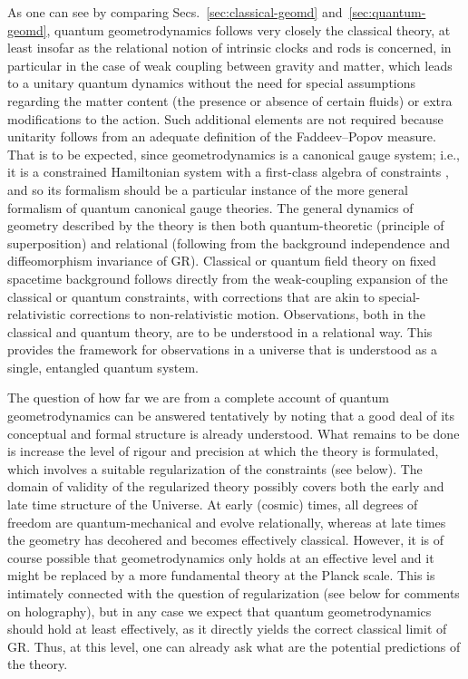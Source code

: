 \documentclass[12pt]{iopart}
\begin{document}
As one can see by comparing Secs.~\ref{sec:classical-geomd} and~\ref{sec:quantum-geomd}, quantum geometrodynamics follows very closely the classical theory, at least insofar as the relational notion of intrinsic clocks and rods is concerned, in particular in the case of weak coupling between gravity and matter, which leads to a unitary quantum dynamics without the need for special assumptions regarding the matter content (the presence or absence of certain fluids) or extra modifications to the action. Such additional elements are not required because unitarity follows from an adequate definition of the Faddeev--Popov measure. That is to be expected, since geometrodynamics is a canonical gauge system; i.e., it is a constrained Hamiltonian system with a first-class algebra of constraints \citep{HT:book}, and so its formalism should be a particular instance of the more general formalism of quantum canonical gauge theories. The general dynamics of geometry described by the theory is then both quantum-theoretic (principle of superposition) and relational (following from the background independence and diffeomorphism invariance of GR). Classical or quantum field theory on fixed spacetime background follows directly from the weak-coupling expansion of the classical or quantum constraints, with corrections that are akin to special-relativistic corrections to non-relativistic motion. Observations, both in the classical and quantum theory, are to be understood in a relational way. This provides the framework for observations in a universe that is understood as a single, entangled quantum system.

The question of how far we are from a complete account of quantum geometrodynamics can be answered tentatively by noting that a good deal of its conceptual and formal structure is already understood. What remains to be done is increase the level of rigour and precision at which the theory is formulated, which involves a suitable regularization of the constraints (see below). The domain of validity of the regularized theory possibly covers both the early and late time structure of the Universe. At early (cosmic) times, all degrees of freedom are quantum-mechanical and evolve relationally, whereas at late times the geometry has decohered and becomes effectively classical. However, it is of course possible that geometrodynamics only holds at an effective level and it might be replaced by a more fundamental theory at the Planck scale. This is intimately connected with the question of regularization (see below for comments on holography), but in any case we expect that quantum geometrodynamics should hold at least effectively, as it directly yields the correct classical limit of GR. Thus, at this level, one can already ask what are the potential predictions of the theory.
\end{document}
